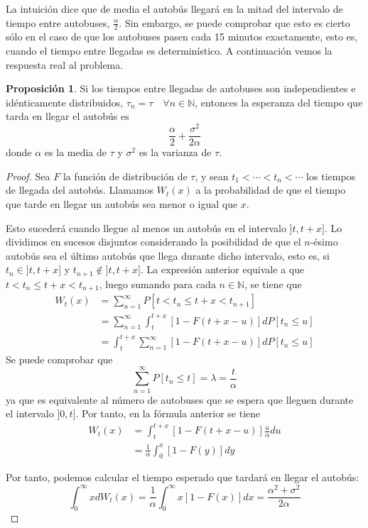 \documentclass[a4paper,10pt]{scrartcl}
\theoremstyle{definition}
\newtheorem*{fact*}{Proposición}
\theoremstyle{definition}
\newtheorem*{fact*}{Proposición}
\numberwithin{equation}{section}
\begin{document}
	La intuición dice que de media el autobús llegará en la mitad del intervalo de tiempo entre autobuses, $\frac{\alpha}{2}$. Sin embargo, se puede comprobar que esto es cierto sólo en el caso de que los autobuses pasen cada 15 minutos exactamente, esto es, cuando el tiempo entre llegadas es determinístico. A continuación vemos la respuesta real al problema.
	
	\begin{fact*}
		Si los tiempos entre llegadas de autobuses son independientes e idénticamente distribuidos, $\tau_n = \tau \quad \forall n \in \mathbb{N}$, entonces la esperanza del tiempo que tarda en llegar el autobús es
		$$\frac{\alpha}{2} + \frac{\sigma^2}{2\alpha} $$
		donde $\alpha$ es la media de $\tau$ y $\sigma^2$ es la varianza de $\tau$.
	\end{fact*}
	
	\begin{proof}
		Sea $F$ la función de distribución de $\tau$, y sean $t_1 < \cdots < t_n < \cdots$ los tiempos de llegada del autobús. Llamamos $W_t(x)$ a la probabilidad de que el tiempo que tarde en llegar un autobús sea menor o igual que $x$.
		
		Esto sucederá cuando llegue al menos un autobús en el intervalo $\rbrack t, t+x\rbrack$. Lo dividimos en sucesos disjuntos considerando la posibilidad de que el $n$-ésimo autobús sea el último autobús que llega durante dicho intervalo, esto es, si $t_n \in \rbrack t, t+x \rbrack$ y $t_{n+1} \notin \rbrack t, t+x \rbrack$. La expresión anterior equivale a que $t < t_n \leq t+x < t_{n+1}$, luego sumando para cada $n \in \mathbb{N}$, se tiene que
		\begin{align*}
		W_t(x) &= \sum_{n=1}^\infty P[t < t_n \leq t+x < t_{n+1}] \\
		&= \sum_{n=1}^\infty \int_t^{t+x} [1-F(t+x-u)]dP[t_n \leq u] \\
		&= \int_t^{t+x} \sum_{n=1}^\infty [1-F(t+x-u)]dP[t_n \leq u]
		\end{align*}
		Se puede comprobar que
		$$ \sum_{n=1}^\infty P[t_n \leq t] = \lambda = \frac{t}{\alpha} $$
		ya que es equivalente al número de autobuses que se espera que lleguen durante el intervalo $\rbrack 0,t \rbrack$.
		Por tanto, en la fórmula anterior se tiene
		\begin{align*}
		W_t(x) &= \int_t^{t+x} [1-F(t+x-u)]\frac{u}{\alpha}du \\
		&= \frac{1}{\alpha}\int_0^x [1-F(y)]dy
		\end{align*}
		
		Por tanto, podemos calcular el tiempo esperado que tardará en llegar el autobús:
		$$ \int_0^\infty xdW_t(x) = \frac{1}{\alpha}\int_0^\infty x[1-F(x)]dx = \frac{\alpha^2+\sigma^2}{2\alpha}$$
	\end{proof}
	
\end{document}
